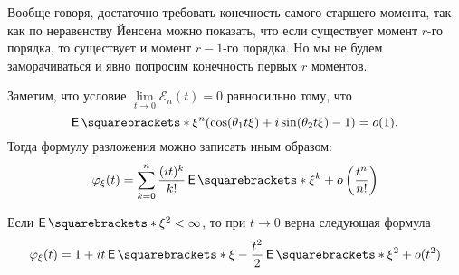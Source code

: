 \begin{remark}
	Вообще говоря, достаточно требовать конечность самого старшего момента, так 
	как по неравенству Йенсена можно показать, что если существует момент 
	\(r\)-го порядка, то существует и момент \(r - 1\)-го порядка. Но мы не 
	будем заморачиваться и явно попросим конечность первых \(r\) моментов.
\end{remark}
\begin{remark}
	Заметим, что условие \(\lim\limits_{t \to 0} \mathcal{E}_n(t) = 0\) 
	равносильно тому, что
	\[
		\E{\xi^{n}(\cos(\theta_1 t\xi) + i\sin(\theta_2 t\xi) - 1)} = o(1).
	\]
	Тогда формулу разложения можно записать иным образом:
	\[
		\phi_{\xi}(t) = \sum_{k = 0}^{n} \frac{(it)^k}{k!}\E{\xi^k} + 
		o\left(\frac{t^n}{n!}\right)
	\]
\end{remark}
\begin{consequence}
	Если \(\E{\xi^2} < \infty\), то при \(t \to 0\) верна следующая формула
	\[
		\phi_{\xi}(t) = 1 + it\E{\xi} - \frac{t^2}{2}\E{\xi^2} + o(t^2)
	\]
\end{consequence}

